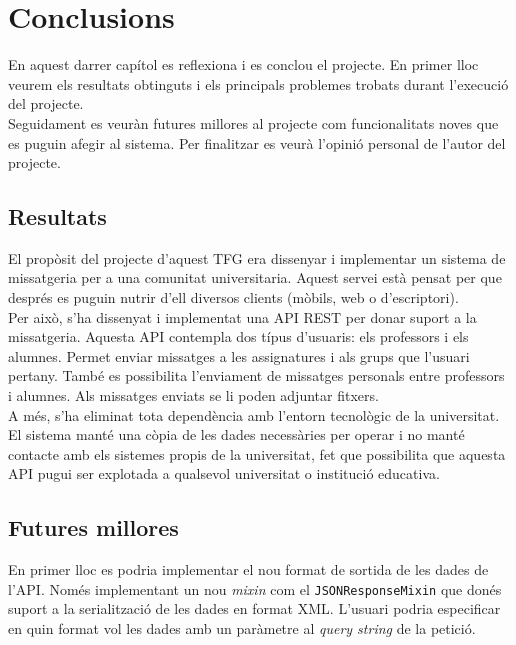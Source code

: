 
\chapter{Conclusions}\label{conclusions}

En aquest darrer capítol es reflexiona i es conclou el projecte. En primer lloc veurem els resultats obtinguts i els principals problemes trobats durant l'execució del projecte.\\

Seguidament es veuràn futures millores al projecte com funcionalitats noves que es puguin afegir al sistema. Per finalitzar es veurà l'opinió personal de l'autor del projecte.\\

\section{Resultats}

El propòsit del projecte d'aquest \ac{TFG} era dissenyar i implementar un sistema de missatgeria per a una comunitat universitaria. Aquest servei està pensat per que després es puguin nutrir d'ell diversos clients (mòbils, web o d'escriptori).\\

Per això, s'ha dissenyat i implementat una \ac{API} \ac{REST} per donar suport a la missatgeria. Aquesta \ac{API} contempla dos típus d'usuaris: els professors i els alumnes. Permet enviar missatges a les assignatures i als grups que l'usuari pertany. També es possibilita l'enviament de missatges personals entre professors i alumnes. Als missatges enviats se li poden adjuntar fitxers.\\

A més, s'ha eliminat tota dependència amb l'entorn tecnològic de la universitat. El sistema manté una còpia de les dades necessàries per operar i no manté contacte amb els sistemes propis de la universitat, fet que possibilita que aquesta \ac{API} pugui ser explotada a qualsevol universitat o institució educativa.\\

\section{Futures millores}

En primer lloc es podria implementar el nou format de sortida de les dades de l'\ac{API}. Només implementant un nou \emph{mixin} com el \texttt{JSONResponseMixin} que donés suport a la serialització de les dades en format \ac{XML}. L'usuari podria especificar en quin format vol les dades amb un paràmetre al \emph{query string} de la petició. \\

